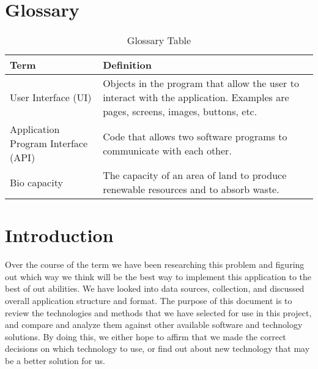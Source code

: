\documentclass[onecolumn, draftclsnofoot,10pt, compsoc]{IEEEtran}
\begin{document}
\section{Glossary}
\begin{table}[h!]
\caption{Glossary Table}
\begin{center}
\begin{tabular}{ | m{6em} | m{9cm}| }
    \hline Term & Definition \\
    \hline User Interface (UI) & Objects in the program that allow the user to interact with the application. Examples are pages, screens, images, buttons, etc. \\
    \hline Application Program Interface (API) & Code that allows two software programs to communicate with each other. \\
    \hline Bio capacity & The capacity of an area of land to produce renewable resources and to absorb waste. \\
    \hline
\end{tabular}
\end{center}
\end{table}

\clearpage

\section{Introduction}
Over the course of the term we have been researching this problem and figuring out which way we think will be the best way to implement this application to the best of out abilities. We have looked into data sources, collection, and discussed overall application structure and format. The purpose of this document is to review the technologies and methods that we have selected for use in this project, and compare and analyze them against other available software and technology solutions. By doing this, we either hope to affirm that we made the correct decisions on which technology to use, or find out about new technology that may be a better solution for us. 
\end{document}

